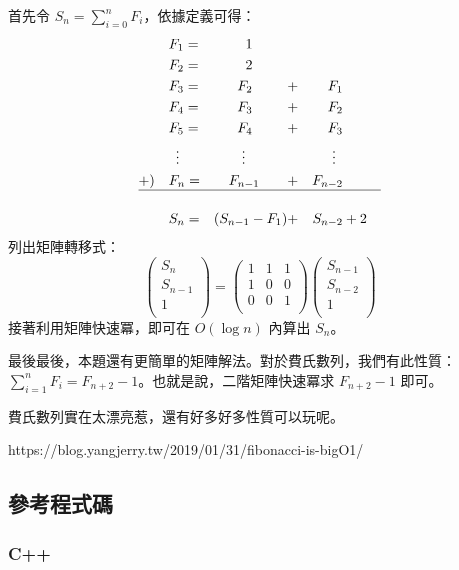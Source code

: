 \documentclass[a4paper,10pt]{article}
\begin{document}
首先令 $S_n = \sum_{i=0}^{n}{F_i}$，依據定義可得：$$\begin{aligned}
& F_1 = & 1 \enspace\qquad \\
& F_2 = & 2 \enspace\qquad \\
& F_3 = & F_2 \enspace\qquad & + & F_1 \\
& F_4 = & F_3 \enspace\qquad & + & F_2 \\
& F_5 = & F_4 \enspace\qquad & + & F_3 \\
& \enspace\vdots & \vdots\quad\qquad & & \vdots\enspace \\
+) \quad & F_n = & F_{n-1} \qquad & + & F_{n-2} \\
\hline \\
& S_n = & (S_{n-1} - F_1) & + & S_{n - 2} & + 2
\end{aligned}$$
列出矩陣轉移式：$$
\left(\begin{array}{c}
       S_n \\
       S_{n-1} \\
       1 \\
      \end{array}
\right)
= \left(\begin{array}{ccc}
       1 & 1 & 1 \\
       1 & 0 & 0 \\
       0 & 0 & 1 \\
      \end{array}
\right)
\left(\begin{array}{c}
       S_{n-1} \\
       S_{n-2} \\
       1 \\
      \end{array}
\right)
$$
接著利用矩陣快速冪，即可在 $O(\log n)$ 內算出 $S_n$。

最後最後，本題還有更簡單的矩陣解法。對於費氏數列，我們有此性質：$\displaystyle\sum_{i=1}^{n}{F_i} = F_{n+2} - 1$。也就是說，二階矩陣快速冪求 $F_{n+2}-1$ 即可。

費氏數列實在太漂亮惹，還有好多好多性質可以玩呢。

https://blog.yangjerry.tw/2019/01/31/fibonacci-is-bigO1/

\subsection{參考程式碼}

\subsubsection{C++}
\end{document}

